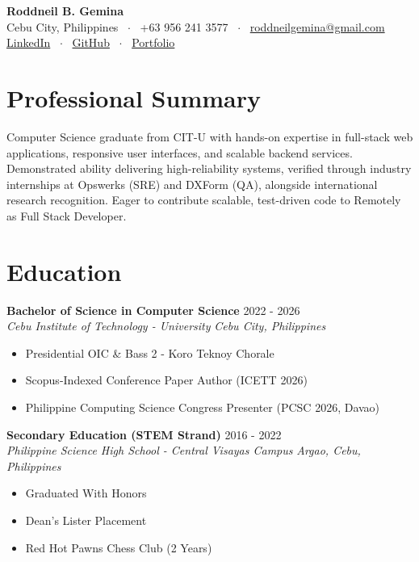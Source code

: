 \documentclass[letterpaper,10pt]{article}
\begin{document}
\begin{center}
    {\LARGE \textbf{Roddneil B. Gemina}} \\ \vspace{2pt}
    \small Cebu City, Philippines \ $\cdot$ \ +63 956 241 3577 \ $\cdot$ \ \href{mailto:roddneilgemina@gmail.com}{roddneilgemina@gmail.com} \\ \vspace{2pt}
    \href{https://www.linkedin.com/in/roddneil-gemina-20b423409}{LinkedIn} \ $\cdot$ \ \href{https://github.com/RoddneilGemina}{GitHub} \ $\cdot$ \ \href{https://roddneilgemina.github.io}{Portfolio}
\end{center}

\vspace{-4pt}
\section{Professional Summary}
Computer Science graduate from CIT-U with hands-on expertise in full-stack web applications, responsive user interfaces, and scalable backend services. Demonstrated ability delivering high-reliability systems, verified through industry internships at Opswerks (SRE) and DXForm (QA), alongside international research recognition. Eager to contribute scalable, test-driven code to Remotely as Full Stack Developer.

\section{Education}
\textbf{Bachelor of Science in Computer Science} \hfill 2022 - 2026
\\ \textit{Cebu Institute of Technology - University} \hfill \textit{Cebu City, Philippines}
\begin{itemize}
  \item Presidential OIC \& Bass 2 - Koro Teknoy Chorale
  \item Scopus-Indexed Conference Paper Author (ICETT 2026)
  \item Philippine Computing Science Congress Presenter (PCSC 2026, Davao)
\end{itemize}
\vspace{4pt}
\textbf{Secondary Education (STEM Strand)} \hfill 2016 - 2022
\\ \textit{Philippine Science High School - Central Visayas Campus} \hfill \textit{Argao, Cebu, Philippines}
\begin{itemize}
  \item Graduated With Honors
  \item Dean's Lister Placement
  \item Red Hot Pawns Chess Club (2 Years)
\end{itemize}
\vspace{4pt}
\end{document}
